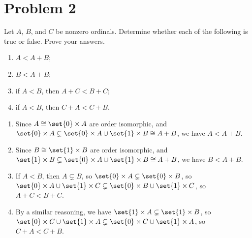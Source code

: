 \documentclass[10pt]{mypackage}
\begin{document}
\section{Problem 2}%
\begin{problem}
  Let $A$, $B$, and $C$ be nonzero ordinals. Determine whether each of the following is true or false. Prove your answers.
  \begin{enumerate}[(1)]
    \item $A < A+B$;
    \item $B < A+B$;
    \item if $A < B$, then $A+C < B+C$;
    \item if $A < B$, then $C+A < C+B$.
  \end{enumerate}
\end{problem}
\begin{solution}\hfill
  \begin{enumerate}[(1)]
    \item Since $A\cong \set{0} \times A$ are order isomorphic, and $\set{0}\times A \subsetneq \set{0}\times A \cup \set{1}\times B\cong A+B$, we have $A < A+B$.
    \item Since $B \cong \set{1}\times B$ are order isomorphic, and $\set{1}\times B \subsetneq \set{0}\times A \cup \set{1}\times B\cong A+B$, we have $B < A+B$.
    \item If $A < B$, then $A\subsetneq B$, so $\set{0}\times A\subsetneq \set{0}\times B$, so $\set{0}\times A\cup \set{1}\times C \subsetneq \set{0}\times B \cup \set{1}\times C$, so $A+C < B+C$.
    \item By a similar reasoning, we have $\set{1}\times A\subsetneq \set{1}\times B$, so $\set{0}\times C\cup \set{1}\times A \subsetneq \set{0}\times C \cup \set{1}\times A$, so $C+A < C+B$.
  \end{enumerate}
\end{solution}
\end{document}
